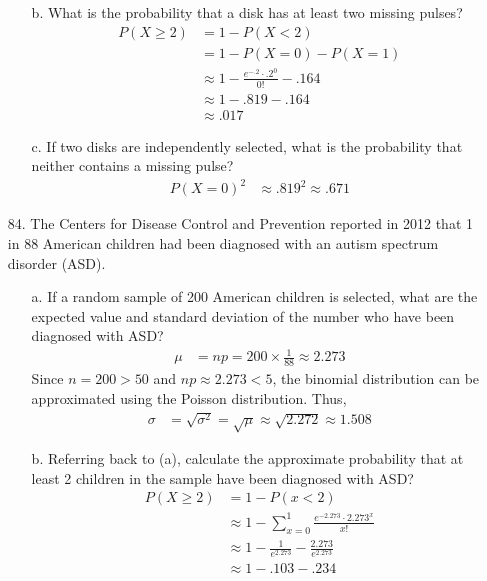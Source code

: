 \documentclass[letterpaper,12pt]{article}
\newcommand{\poisson}[2]{%
  \frac{e^{-#2} \cdot #2^{#1}}{#1!}%
}
\newcommand{\poissonsum}[3]{%
  \sum_{x = #1}^{#2} \poisson{x}{#3}%
}
\begin{document}
\begin{enumerate}
\begin{enumerate}
      \item[b.]
        What is the probability that a disk has at least two missing pulses?
        \begin{align*}
          P(X \ge 2) &= 1 - P(X < 2) \\
          &= 1 - P(X = 0) - P(X = 1) \\
          &\approx 1 - \poisson{0}{.2} - .164 \\
          &\approx 1 - .819 - .164 \\
          &\approx .017
        \end{align*}
      \item[c.]
        If two disks are independently selected, what is the probability that neither contains a missing pulse?
        \begin{align*}
          P(X = 0)^2 &\approx .819^2 \approx .671
        \end{align*}
    \end{enumerate}
  \item[84.]
    The Centers for Disease Control and Prevention reported in 2012 that 1 in 88 American children had been diagnosed with an autism spectrum disorder (ASD).
    \begin{enumerate}
      \item[a.]
        If a random sample of 200 American children is selected, what are the expected value and standard deviation of the number who have been diagnosed with ASD?
        \begin{align*}
          \mu &= np = 200 \times \frac{1}{88} \approx 2.273
        \end{align*}
        Since $n = 200 > 50$ and $np \approx 2.273 < 5$, the binomial distribution can be approximated using the Poisson distribution. Thus,
        \begin{align*}
          \sigma &= \sqrt{\sigma^2} = \sqrt{\mu} \approx \sqrt{2.272} \approx 1.508
        \end{align*}
      \item[b.]
        Referring back to (a), calculate the approximate probability that at least 2 children in the sample have been diagnosed with ASD?
        \begin{align*}
          P(X \ge 2) &= 1 - P(x < 2) \\
          &\approx 1 - \poissonsum{0}{1}{2.273} \\
          &\approx 1 - \frac{1}{e^{2.273}} - \frac{2.273}{e^{2.273}} \\
          &\approx 1 - .103 - .234 \\

\end{align*}
\end{enumerate}
\end{enumerate}
\end{document}
